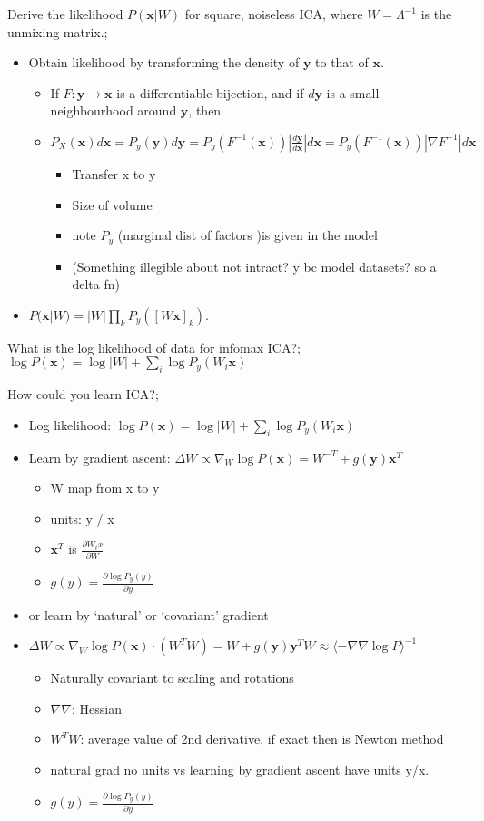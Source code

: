 \documentclass{article}
\begin{document}
Derive the likelihood $P(\mathbf{x}|W)$ for square, noiseless ICA, where $W=\Lambda^{-1}$ is the unmixing matrix.; \begin{itemize} \item Obtain likelihood by transforming the density of $\mathbf{y}$ to that of $\mathbf{x}$. \begin{itemize} \item If $F:\mathbf{y}\to\mathbf{x}$ is a differentiable bijection, and if $d\mathbf{y}$ is a small neighbourhood around $\mathbf{y}$, then \item $P_X(\mathbf{x})d\mathbf{x}=P_y(\mathbf{y})d\mathbf{y}=P_y(F^{-1}(\mathbf{x}))|\frac{d\mathbf{y}}{d\mathbf{x}}|d\mathbf{x}=P_y(F^{-1}(\mathbf{x}))|\nabla F^{-1}|d\mathbf{x}$ \begin{itemize} \item Transfer x to y \item Size of volume  \item note $P_y$ (marginal dist of factors )is given in the model \item (Something illegible about not intract? y bc model datasets? so a delta fn) \end{itemize} \end{itemize} \item $P(\mathbf{x}|W)=|W|\prod_kP_y([W\mathbf{x}]_k)$. \end{itemize}

What is the log likelihood of data for infomax ICA?; $\log P(\mathbf{x})=\log|W|+\sum_i \log P_y(W_i\mathbf{x})$

How could you learn ICA?; \begin{itemize} \item Log likelihood: $\log P(\mathbf{x})=\log|W|+\sum_i \log P_y(W_i\mathbf{x})$  \item Learn by gradient ascent: $\Delta W\propto \nabla_W\log P(\mathbf{x}) = W^{-T}+g(\mathbf{y})\mathbf{x}^T$ \begin{itemize} \item W map from x to y \item units: y / x \item $\mathbf{x}^T$ is $\frac{\partial W_ix}{\partial W}$ \item $g(y)=\frac{\partial \log P_y(y)}{\partial y}$ \end{itemize} \item or learn by `natural' or `covariant' gradient \item $\Delta W\propto \nabla_W\log P(\mathbf{x})\cdot (W^TW) = W + g(\mathbf{y})\mathbf{y}^TW \approx \langle -\nabla\nabla\log P\rangle^{-1}$ \begin{itemize} \item Naturally covariant to scaling and rotations \item $\nabla\nabla$: Hessian \item $W^TW$: average value of 2nd derivative, if exact then is Newton method \item natural grad no units vs learning by gradient ascent have units y/x. \item $g(y)=\frac{\partial \log P_y(y)}{\partial y}$ \end{itemize} \end{itemize}
\end{document}
